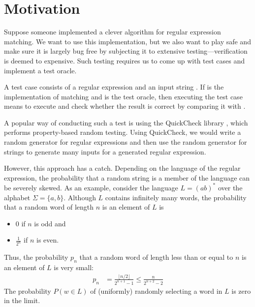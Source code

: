 \section{Motivation}
\label{sec:motivation}

Suppose someone implemented a clever algorithm for
regular expression matching. 
We want to use this implementation, but we also want to play safe and
make sure it is largely bug free by subjecting it to extensive
testing---verification is deemed to expensive.
Such testing requires us to come up with test cases and
implement a test oracle.


A test case consists of a regular expression  and an input
string . If  is the implementation of matching
and  is the test oracle, then
executing the test case means to execute  and check whether the result is correct by comparing it with
. 

A popular way of conducting such a test is using the QuickCheck library
\cite{DBLP:conf/icfp/ClaessenH00}, which performs property-based random testing. Using
QuickCheck, we would write a random generator for regular expressions
and then use the random generator for strings to generate many inputs for a
generated regular expression.

However, this approach has a
catch. Depending on the language of the regular expression, the
probability that a random string is a member of the language can be
severely skewed. As an example, consider the language $L = (ab)^*$ over the
alphabet $\Sigma = \{a, b\}$. Although $L$ contains infinitely many
words, the probability that a random word of
length $n$ is an element of $L$ is
\begin{itemize}
\item $0$ if $n$ is odd and
\item $\frac{1}{2^n}$ if $n$ is even.
\end{itemize}
Thus, the probability $p_n$ that a random word of length less than or equal to
$n$ is an element of $L$ is very small:
\begin{align*}
  p_n &= \frac{\lfloor n/2 \rfloor}{2^{n+1} - 1}
        \le \frac{n}{2^{n+2} - 2}
\end{align*}
The probability $P (w\in L)$ of (uniformly) randomly
selecting a word in $L$ is zero in the limit.

